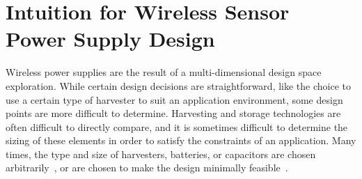 \chapter{Intuition for Wireless Sensor Power Supply Design}
\label{chap:intuition}

Wireless power supplies are the result of a multi-dimensional design space exploration.
While certain design decisions are straightforward, like the choice to use a certain type of harvester to suit an application environment, some design points are more difficult to determine. 
Harvesting and storage technologies are often difficult to directly compare, and it is sometimes difficult to determine the sizing of these elements in order to satisfy the constraints of an application. 
Many times, the type and size of harvesters, batteries, or capacitors are chosen arbitrarily~\cite{hamiltoniot}, or are chosen to make the design minimally feasible~\cite{yervaGrafting12,debruin2013monjolo,hesterFlicker17,afanasov2020battery}.

